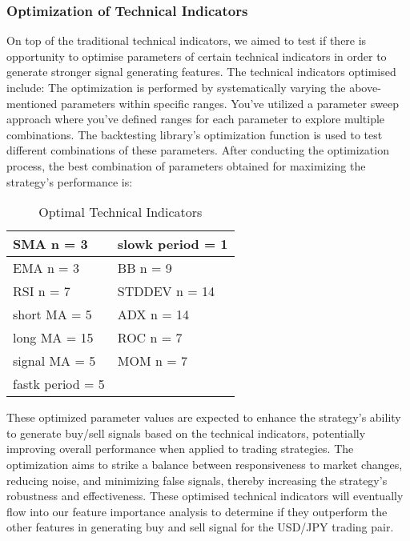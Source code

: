 \documentclass{article}
\begin{document}
\subsubsection{Optimization of Technical Indicators}
On top of the traditional technical indicators, we aimed to test if there is opportunity to optimise parameters of certain technical indicators in order to generate stronger signal generating features. The technical indicators optimised include:
\newline
\newline
The optimization is performed by systematically varying the above-mentioned parameters within specific ranges. You've utilized a parameter sweep approach where you've defined ranges for each parameter to explore multiple combinations. The backtesting library's optimization function is used to test different combinations of these parameters.
\newline
\newline
After conducting the optimization process, the best combination of parameters obtained for maximizing the strategy's performance is:
\begin{table}[h!]
\centering
\begin{tabular}{|l|l|}
\hline
SMA n = 3 & slowk period = 1 \\
\hline
EMA n = 3 & BB n = 9 \\
\hline
RSI n = 7 & STDDEV n = 14 \\
\hline
short MA = 5 & ADX n = 14 \\
\hline
long MA = 15 & ROC n = 7 \\
\hline
signal MA = 5 & MOM n = 7 \\
\hline
fastk period = 5 &   \\
\hline
\end{tabular}
\caption{Optimal Technical Indicators}
\label{table:Optimization results}
\end{table}
\newline
These optimized parameter values are expected to enhance the strategy's ability to generate buy/sell signals based on the technical indicators, potentially improving overall performance when applied to trading strategies. The optimization aims to strike a balance between responsiveness to market changes, reducing noise, and minimizing false signals, thereby increasing the strategy's robustness and effectiveness.
\newline
\newline
These optimised technical indicators will eventually flow into our feature importance analysis to determine if they outperform the other features in generating buy and sell signal for the USD/JPY trading pair.
\end{document}

